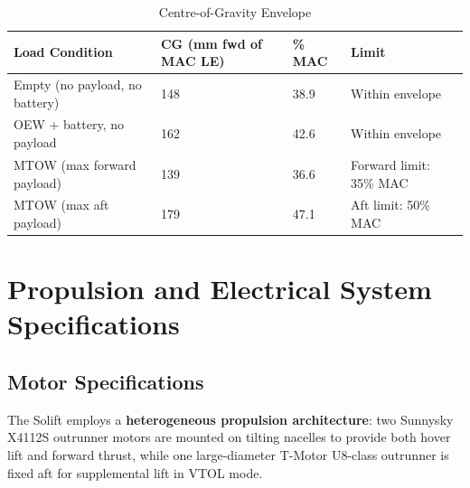 \begin{table}[H]
\centering
\small
\caption{Centre-of-Gravity Envelope}
\begin{tabularx}{\textwidth}{L{4.5cm} C{2.8cm} C{2.2cm} X}
\toprule
\textbf{Load Condition} &
\textbf{CG (mm fwd of MAC LE)} &
\textbf{\% MAC} &
\textbf{Limit} \\
\midrule
Empty (no payload, no battery)  & 148 & 38.9 & Within envelope \\
OEW + battery, no payload       & 162 & 42.6 & Within envelope \\
MTOW (max forward payload)      & 139 & 36.6 & Forward limit: 35\% MAC \\
MTOW (max aft payload)          & 179 & 47.1 & Aft limit: 50\% MAC \\
\bottomrule
\end{tabularx}
\end{table}

\section{Propulsion and Electrical System Specifications}

\subsection{Motor Specifications}

The Solift employs a \textbf{heterogeneous propulsion architecture}: two Sunnysky X4112S outrunner motors are mounted on tilting nacelles to provide both hover lift and forward thrust, while one large-diameter T-Motor U8-class outrunner is fixed aft for supplemental lift in VTOL mode.

